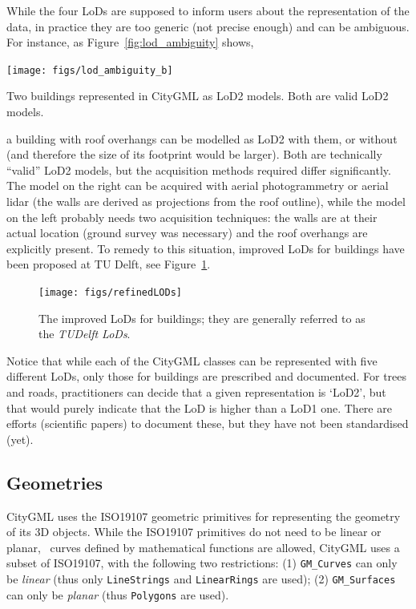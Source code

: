 While the four LoDs are supposed to inform users about the representation of the data, in practice they are too generic (not precise enough) and can be ambiguous. 
For instance, as Figure~\ref{fig:lod_ambiguity} shows,
\begin{marginfigure}
  \centering
  \texttt{[image: figs/lod\_ambiguity\_b]}
  \caption[Two buildings represented in CityGML as LoD2 models]{Two buildings represented in CityGML as LoD2 models. Both are valid LoD2 models.}%
\label{fig:lod_ambiguity}
\end{marginfigure}
a building with roof overhangs can be modelled as LoD2 with them, or without (and therefore the size of its footprint would be larger).
Both are technically ``valid'' LoD2 models, but the acquisition methods required differ significantly.
The model on the right can be acquired with aerial photogrammetry or aerial lidar (the walls are derived as projections from the roof outline), while the model on the left probably needs two acquisition techniques: the walls are at their actual location (ground survey was necessary) and the roof overhangs are explicitly present.
To remedy to this situation, improved LoDs for buildings have been proposed at TU Delft, see Figure~\ref{fig:refinedLODs}.
\begin{figure}
  \centering
  \texttt{[image: figs/refinedLODs]}
  \caption[The TUDelft LoDs]{The improved LoDs for buildings; they are generally referred to as the \emph{TUDelft LoDs}.}%
\label{fig:refinedLODs}
\end{figure}

%

Notice that while each of the CityGML classes can be represented with five different LoDs, only those for buildings are prescribed and documented.
For trees and roads, practitioners can decide that a given representation is `LoD2', 
but that would purely indicate that the LoD is higher than a LoD1 one.
There are efforts (scientific papers) to document these, but they have not been standardised (yet).


\subsection{Geometries}

CityGML uses the ISO19107 geometric primitives for representing the geometry of its 3D objects.
While the ISO19107 primitives do not need to be linear or planar, \ie\ curves defined by mathematical functions are allowed, CityGML uses a subset of ISO19107, with the following two restrictions: (1) \texttt{GM\_Curves} can only be \emph{linear} (thus only \texttt{LineStrings} and \texttt{LinearRings} are used); (2) \texttt{GM\_Surfaces} can only be \emph{planar} (thus \texttt{Polygons} are used).

